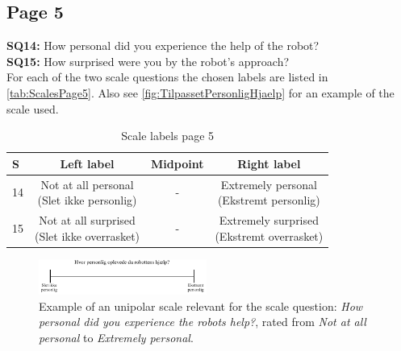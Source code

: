 \subsection{Page 5}
\noindent
\textbf{SQ14:} How personal did you experience the help of the robot?\\%
\textbf{SQ15:} How surprised were you by the robot's approach?\\%
For each of the two scale questions the chosen labels are listed in \autoref{tab:ScalesPage5}. Also see \autoref{fig:TilpassetPersonligHjaelp} for an example of the scale used.
%
\begin{table}[H]
	\centering
\caption{Scale labels page 5}
	\label{tab:ScalesPage5} 
	\begin{tabular}{l|c|c|c}
		S     & Left label & Midpoint & Right label \\\hline
		14   & \makecell{Not at all personal\\(Slet ikke personlig)}  & - & \makecell{Extremely personal\\(Ekstremt personlig)}        \\\hline
		15   & \makecell{Not at all surprised\\(Slet ikke overrasket)} & - & \makecell{Extremely surprised \\(Ekstremt overrasket)}               
	\end{tabular}        
\end{table}
\noindent
%
\begin{figure}[H]
\centering
\includegraphics[width = 0.49\textwidth]{Figure/TilpassetPersonligHjaelp}
\setlength{} 
\caption{Example of an unipolar scale relevant for the scale question: \textit{How personal did you experience the robots help?}, rated from \textit{Not at all personal} to \textit{Extremely personal}.}
\label{fig:TilpassetPersonligHjaelp}
\end{figure}
\noindent
% 

